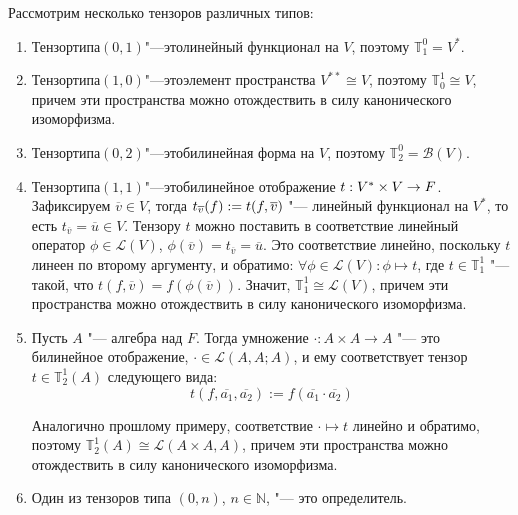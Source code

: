 \begin{example}
	Рассмотрим несколько тензоров различных типов:
	\begin{enumerate}
		\item Тензор\;типа\;$(0, 1)$\:"---\:это\;линейный функционал на $V$, поэтому $\mathbb{T}_1^0 = V^*$.
		
		\item Тензор\;типа\;$(1, 0)$\:"---\:это\;элемент пространства $V^{**} \cong V$, поэтому $\mathbb{T}^1_0 \cong V$, причем эти пространства можно отождествить в силу канонического изоморфизма.
		
		\item Тензор\;типа\;$(0, 2)$\:"---\:это\;билинейная форма на $V$, поэтому $\mathbb{T}^0_2 = \mathcal{B}(V)$.
		
		\item Тензор\;типа\;$(1, 1)$\:"---\:это\;билинейное отображение $t: V^* \times V \hm{\rightarrow} F$. Зафиксируем $\overline{v} \in V$, тогда $t_{\overline{v}}(f) \hm{:=} t(f, \overline{v})$ "--- линейный функционал на $V^*$, то есть $t_{\overline{v}} = \overline{u} \in V$. Тензору $t$ можно поставить в соответствие линейный оператор $\phi \in \mathcal{L}(V)$, $\phi(\overline{v}) = t_{\overline{v}} = \overline{u}$. Это соответствие линейно, поскольку $t$ линеен по второму аргументу, и обратимо: $\forall \phi \in \mathcal{L}(V): \phi \mapsto t$, где $t \in \mathbb{T}^1_1$ "--- такой, что $t(f, \overline{v}) = f(\phi(\overline{v}))$. Значит, $\mathbb{T}^1_1 \cong \mathcal{L}(V)$, причем эти пространства можно отождествить в силу канонического изоморфизма.
		
		\item Пусть $A$ "--- алгебра над $F$. Тогда умножение $\cdot: A \times A \rightarrow A$ "--- это билинейное отображение, $\cdot \in \mathcal{L}(A, A; A)$, и ему соответствует тензор $t \in \mathbb{T}^1_2(A)$ следующего вида:
		\[t(f, \overline{a_1}, \overline{a_2}) := f(\overline{a_1} \cdot \overline{a_2})\]
		
		Аналогично прошлому примеру, соответствие $\cdot \mapsto t$ линейно и обратимо, поэтому $\mathbb T^1_2(A) \cong \mathcal{L}(A \times A, A)$, причем эти пространства можно отождествить в силу канонического изоморфизма.
			
		\item Один из тензоров типа $(0, n)$, $n \in \mathbb{N}$, "--- это определитель.
	\end{enumerate}
\end{example}


